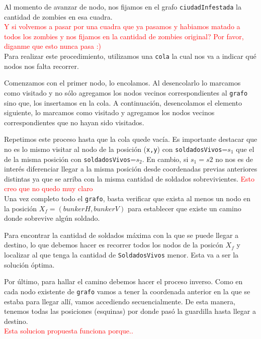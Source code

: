 Al momento de avanzar de nodo, nos fijamos en el grafo \texttt{ciudadInfestada} la cantidad de zombies en esa cuadra.\\

\textcolor{red}{Y si volvemos a pasar por una cuadra que ya pasamos y habiamos matado a todos los zombies y nos fijamos en la cantidad de zombies original? Por favor, diganme que esto nunca pasa :)}\\

Para realizar este procedimiento, utilizamos una \texttt{cola} la cual nos va a indicar qu\'e nodos nos falta recorrer.

Comenzamos con el primer nodo, lo encolamos. Al desencolarlo lo marcamos como visitado y no s\'olo agregamos los nodos vecinos correspondientes al \texttt{grafo} sino que, los insertamos en la cola. A continuaci\'on, desencolamos el elemento siguiente, lo marcamos como visitado y agregamos los nodos vecinos correspondientes que no hayan sido visitados.

Repetimos este proceso hasta que la cola quede vac\'ia. Es importante destacar que no es lo mismo visitar al nodo de la posici\'on (\texttt{x,y}) con \texttt{soldadosVivos}=$s_1$ que el de la misma posici\'on con \texttt{soldadosVivos}=$s_2$. En cambio, si $s_1=s2$ no nos es de inter\'es diferenciar llegar a la misma posici\'on desde coordenadas previas anteriores distintas ya que se arriba con la misma cantidad de soldados sobrevivientes. \textcolor{red}{Esto creo que no quedo muy claro}\\

Una vez completo todo el \texttt{grafo}, basta verificar que exista al menos un nodo en la posici\'on $X_f = (bunkerH, bunkerV)$ para establecer que existe un camino donde sobrevive alg\'un soldado.

Para encontrar la cantidad de soldados m\'axima con la que se puede llegar a destino, lo que debemos hacer es recorrer todos los nodos de la posic\'on $X_f$ y localizar al que tenga la cantidad de \texttt{SoldadosVivos} menor. Esta va a ser la soluci\'on \'optima.

Por \'ultimo, para hallar el camino debemos hacer el proceso inverso. Como en cada nodo existente de \texttt{grafo} vamos a tener la coordenada anterior en la que se estaba para llegar all\'i, vamos accediendo secuencialmente. De esta manera, tenemos todas las posiciones (esquinas) por donde pas\'o la guardilla hasta llegar a destino.\\

\bigskip
\textcolor{red}{Esta solucion propuesta funciona porque..}




